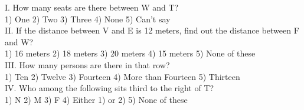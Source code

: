 \documentclass[
]{article}
\begin{document}
I. How many seats are there between W and T?\\
1) One \hspace{2mm}2) Two \hspace{2mm}3) Three \hspace{2mm}4) None \hspace{2mm}5) Can’t say\\

II. If the distance between V and E is 12 meters, find out the distance between F and W?\\
1) 16 meters \hspace{2mm}2) 18 meters \hspace{2mm}3) 20 meters \hspace{2mm}4) 15 meters \hspace{2mm}5) None of these\\

III. How many persons are there in that row?\\
1) Ten \hspace{2mm}2) Twelve \hspace{2mm}3) Fourteen \hspace{2mm}4) More than Fourteen \hspace{2mm}5) Thirteen\\

IV. Who among the following sits third to the right of T?\\
1) N \hspace{2mm}2) M \hspace{2mm}3) F \hspace{2mm}4) Either 1) or 2) \hspace{2mm}5) None of these\\
\end{document}
